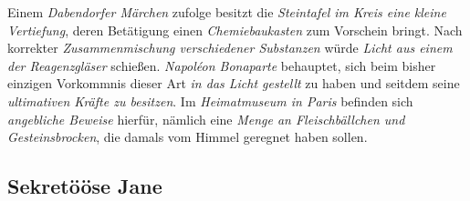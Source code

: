 Einem \textit{Dabendorfer Märchen} zufolge besitzt die \textit{Steintafel im Kreis eine kleine Vertiefung}, deren Betätigung einen \textit{Chemiebaukasten} zum Vorschein bringt. Nach korrekter \textit{Zusammenmischung verschiedener Substanzen} würde \textit{Licht aus einem der Reagenzgläser} schießen. \textit{Napoléon Bonaparte} behauptet, sich beim bisher einzigen Vorkommnis dieser Art \textit{in das Licht gestellt} zu haben und seitdem seine \textit{ultimativen Kräfte zu besitzen}. Im \textit{Heimatmuseum in Paris} befinden sich \textit{angebliche Beweise} hierfür, nämlich eine \textit{Menge an Fleischbällchen und Gesteinsbrocken}, die damals vom Himmel geregnet haben sollen.

\subsection{{Sekretööse Jane}}
